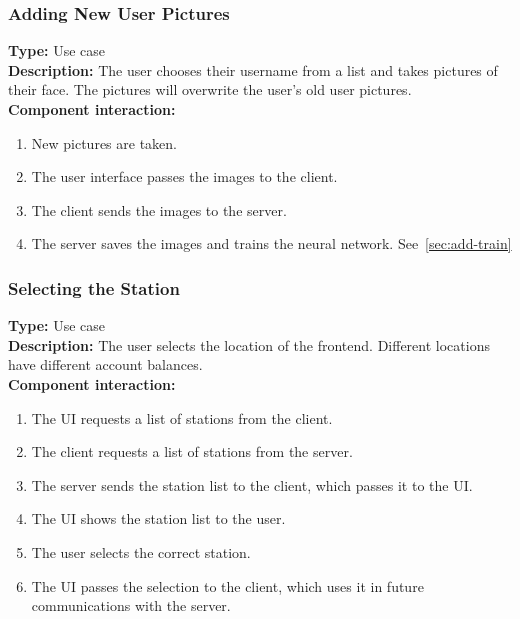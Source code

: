 \documentclass[11pt]{article}
\begin{document}
\subsubsection{Adding New User Pictures}
\textbf{Type:} Use case\\
\textbf{Description:} The user chooses their username from a list and takes pictures of their face. 
The pictures will overwrite the user's old user pictures.\\
\textbf{Component interaction:}
\begin{enumerate} 
\item{New pictures are taken.}
\item{The user interface passes the images to the client.}
\item{The client sends the images to the server.}
\item{The server saves the images and trains the neural network. See~\ref{sec:add-train}}
\end{enumerate}

\subsubsection{Selecting the Station}
\textbf{Type:} Use case\\
\textbf{Description:} The user selects the location of the frontend. Different locations
have different account balances.\\
\textbf{Component interaction:}\\
\begin{enumerate}
\item{The UI requests a list of stations from the client.}
\item{The client requests a list of stations from the server.}
\item{The server sends the station list to the client, which passes it to the UI.}
\item{The UI shows the station list to the user.}
\item{The user selects the correct station.}
\item{The UI passes the selection to the client, which uses it in future communications with
the server.}
\end{enumerate}
\end{document}
